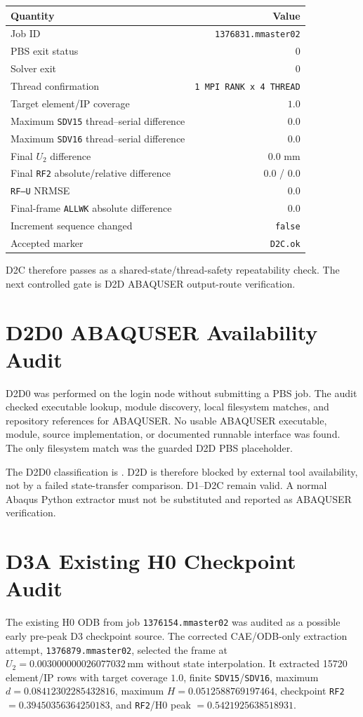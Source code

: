 \documentclass[11pt,a4paper]{article}
\begin{document}
\begin{table}[h]
\centering
\begin{tabular}{@{}lr@{}}
\toprule
Quantity & Value \\
\midrule
Job ID & \texttt{1376831.mmaster02} \\
PBS exit status & $0$ \\
Solver exit & $0$ \\
Thread confirmation & \texttt{1 MPI RANK x 4 THREAD} \\
Target element/IP coverage & $1.0$ \\
Maximum \texttt{SDV15} thread--serial difference & $0.0$ \\
Maximum \texttt{SDV16} thread--serial difference & $0.0$ \\
Final $U_2$ difference & $0.0$ mm \\
Final \texttt{RF2} absolute/relative difference & $0.0$ / $0.0$ \\
\texttt{RF--U} NRMSE & $0.0$ \\
Final-frame \texttt{ALLWK} absolute difference & $0.0$ \\
Increment sequence changed & \texttt{false} \\
Accepted marker & \texttt{D2C.ok} \\
\bottomrule
\end{tabular}
\end{table}

D2C therefore passes as a shared-state/thread-safety repeatability check. The
next controlled gate is D2D ABAQUSER output-route verification.

\section{D2D0 ABAQUSER Availability Audit}
D2D0 was performed on the login node without submitting a PBS job. The audit
checked executable lookup, module discovery, local filesystem matches, and
repository references for ABAQUSER. No usable ABAQUSER executable, module,
source implementation, or documented runnable interface was found. The only
filesystem match was the guarded D2D PBS placeholder.

The D2D0 classification is
. D2D is therefore blocked by
external tool availability, not by a failed state-transfer comparison. D1--D2C
remain valid. A normal Abaqus Python extractor must not be substituted and
reported as ABAQUSER verification.

\section{D3A Existing H0 Checkpoint Audit}
The existing H0 ODB from job \texttt{1376154.mmaster02} was audited as a
possible early pre-peak D3 checkpoint source. The corrected CAE/ODB-only
extraction attempt, \texttt{1376879.mmaster02}, selected the frame at
$U_2=0.003000000026077032\,\mathrm{mm}$ without state interpolation. It
extracted 15720 element/IP rows with target coverage $1.0$, finite
\texttt{SDV15}/\texttt{SDV16}, maximum $d=0.08412302285432816$, maximum
$H=0.0512588769197464$, checkpoint \texttt{RF2}
$=0.39450356364250183$, and \texttt{RF2}/H0 peak
$=0.5421925638518931$.
\end{document}
